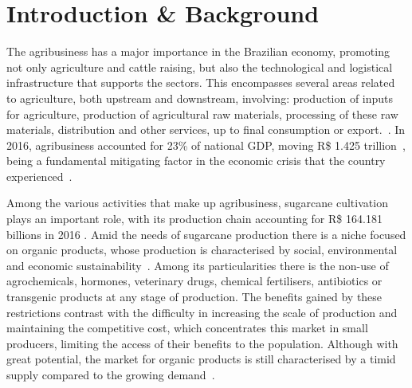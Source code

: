 \documentclass[
	12pt,				%
	oneside,			%
	a4paper,			%
	brazil,			    %
	french,				%
	spanish,			%
	english,			%
	]{abntex2}
\begin{document}
\tableofcontents*
\cleardoublepage


\textual


\chapter[Introduction \& Background]{Introduction \& Background}
  
  The agribusiness has a major importance in the Brazilian economy, promoting not only agriculture and cattle raising, but also the technological and logistical infrastructure that supports the sectors. This encompasses several areas related to agriculture, both upstream and downstream, involving: production of inputs for agriculture, production of agricultural raw materials, processing of these raw materials, distribution and other services, up to final consumption or export.~\cite{cepea}. In 2016, agribusiness accounted for 23\% of national GDP, moving R\$ 1.425 trillion~\cite{cna}, being a fundamental mitigating factor in the economic crisis that the country experienced~\cite{agro_canal_rural}.
  
  Among the various activities that make up agribusiness, sugarcane cultivation plays an important role, with its production chain accounting for R\$ 164.181 billions in 2016 \cite{cna}. Amid the needs of sugarcane production there is a niche focused on organic products, whose production is characterised by social, environmental and economic sustainability~\cite{organicos_canal_rural}. Among its particularities there is the non-use of agrochemicals, hormones, veterinary drugs, chemical fertilisers, antibiotics or transgenic products at any stage of production. The benefits gained by these restrictions contrast with the difficulty in increasing the scale of production and maintaining the competitive cost, which concentrates this market in small producers, limiting the access of their benefits to the population. Although with great potential, the market for organic products is still characterised by a timid supply compared to the growing demand~\cite{organicos_carta_capital}.
  
\end{document}
